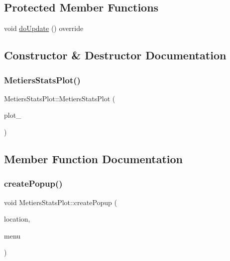 \subsection*{Protected Member Functions}
\begin{DoxyCompactItemize}
\item 
void \mbox{\hyperlink{class_metiers_stats_plot_a69af2cc87d8a30a7172f543973007f4e}{do\+Update}} () override
\end{DoxyCompactItemize}


\subsection{Constructor \& Destructor Documentation}
\mbox{\label{class_metiers_stats_plot_add1fd1a36fec21be99965219fce2574d}} 
\subsubsection{\texorpdfstring{MetiersStatsPlot()}{MetiersStatsPlot()}}
{\footnotesize\ttfamily Metiers\+Stats\+Plot\+::\+Metiers\+Stats\+Plot (\begin{DoxyParamCaption}\item[{\mbox{\hyperlink{class_q_custom_plot}{Q\+Custom\+Plot}} $\ast$}]{plot\+\_\+ }\end{DoxyParamCaption})\hspace{0.3cm}{\ttfamily [explicit]}}



\subsection{Member Function Documentation}
\mbox{\label{class_metiers_stats_plot_aa6c7ae8d2e437f4d1d4054c72ad2a951}} 
\subsubsection{\texorpdfstring{createPopup()}{createPopup()}}
{\footnotesize\ttfamily void Metiers\+Stats\+Plot\+::create\+Popup (\begin{DoxyParamCaption}\item[{\mbox{\hyperlink{class_graph_interaction_controller_a67e6eba082927bf2b984bed54fe32764}{Graph\+Interaction\+Controller\+::\+Popup\+Menu\+Location}}}]{location,  }\item[{Q\+Menu $\ast$}]{menu }\end{DoxyParamCaption})}

